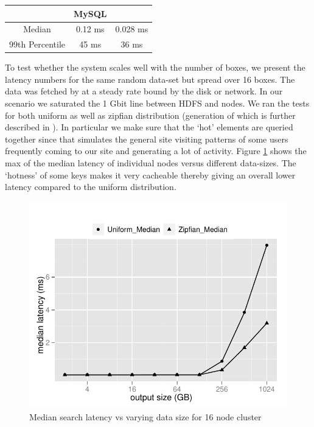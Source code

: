 \begin{center}
    \begin{tabular}{ | c | c | c |  }
    \hline
     & MySQL & \projectname{} \\ \hline
    Median &   0.12 ms &  0.028	ms \\
	99th Percentile	& 45 ms & 36 ms \\
\hline
    \end{tabular}
\end{center}

To test whether the system scales well with the number of boxes, we
present the latency numbers for the same random data-set but spread
over 16 boxes. The data was fetched by \projectname{} at a steady rate
bound by the disk or network. In our scenario we saturated the 1 Gbit
line between HDFS and \projectname{} nodes. We ran the tests for both
uniform as well as zipfian distribution (generation of which is
further described in \cite{gray}). In particular we make sure that the
`hot' elements are queried together since that simulates the general
site visiting patterns of some users frequently coming to our site and
generating a lot of activity. Figure \ref{16search} shows the max of
the median latency of individual nodes versus different data-sizes.
The `hotness' of some keys makes it very cacheable thereby giving an
overall lower latency compared to the uniform distribution. 

\begin{figure}
  \centering
    \includegraphics[scale=0.55]{images/search_16node.pdf}
  \caption{Median search latency vs varying data size for 16 node cluster}
  \label{16search}
\end{figure}

